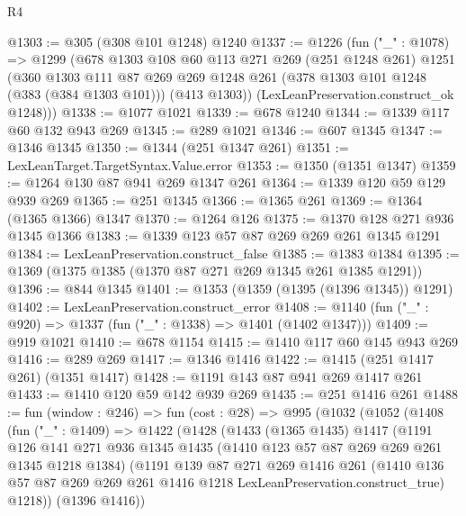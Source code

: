 \begin{lexlean}{R4}
\begin{coremodule}
{{{{{{{{{{{{{{@1303 := @305 (@308 @101 @1248) @1240
@1337 := @1226
    (fun ("_" : @1078) =>
    @1299
      (@678
        @1303
        @108
        @60
        @113
        @271
        @269
        (@251 @1248 @261)
        @1251
        (@360
          @1303
          @111
          @87
          @269
          @269
          @1248
          @261
          (@378 @1303 @101 @1248 (@383 (@384 @1303 @101)))
          (@413 @1303))
        (LexLeanPreservation.construct_ok @1248)))
@1338 := @1077 @1021
@1339 := @678 @1240
@1344 := @1339 @117 @60 @132 @943 @269
@1345 := @289 @1021
@1346 := @607 @1345
@1347 := @1346 @1345
@1350 := @1344 (@251 @1347 @261)
@1351 := LexLeanTarget.TargetSyntax.Value.error
@1353 := @1350 (@1351 @1347)
@1359 := @1264 @130 @87 @941 @269 @1347 @261
@1364 := @1339 @120 @59 @129 @939 @269
@1365 := @251 @1345
@1366 := @1365 @261
@1369 := @1364 (@1365 @1366) @1347
@1370 := @1264 @126
@1375 := @1370 @128 @271 @936 @1345 @1366
@1383 := @1339 @123 @57 @87 @269 @269 @261 @1345 @1291
@1384 := LexLeanPreservation.construct_false
@1385 := @1383 @1384
@1395 := @1369 (@1375 @1385 (@1370 @87 @271 @269 @1345 @261 @1385 @1291))
@1396 := @844 @1345
@1401 := @1353 (@1359 (@1395 (@1396 @1345)) @1291)
@1402 := LexLeanPreservation.construct_error
@1408 := @1140 (fun ("_" : @920) => @1337 (fun ("_" : @1338) => @1401 (@1402 @1347)))
@1409 := @919 @1021
@1410 := @678 @1154
@1415 := @1410 @117 @60 @145 @943 @269
@1416 := @289 @269
@1417 := @1346 @1416
@1422 := @1415 (@251 @1417 @261) (@1351 @1417)
@1428 := @1191 @143 @87 @941 @269 @1417 @261
@1433 := @1410 @120 @59 @142 @939 @269
@1435 := @251 @1416 @261
@1488 := fun (window : @246) =>
  fun (cost : @28) =>
  @995
    (@1032
      (@1052
        (@1408
          (fun ("_" : @1409) =>
          @1422
            (@1428
              (@1433
                (@1365 @1435)
                @1417
                (@1191
                  @126
                  @141
                  @271
                  @936
                  @1345
                  @1435
                  (@1410 @123 @57 @87 @269 @269 @261 @1345 @1218 @1384)
                  (@1191
                    @139
                    @87
                    @271
                    @269
                    @1416
                    @261
                    (@1410
                      @136
                      @57
                      @87
                      @269
                      @269
                      @261
                      @1416
                      @1218
                      LexLeanPreservation.construct_true)
                    @1218))
                (@1396 @1416))
}}}}}}}}}}}}}}
\end{coremodule}
\end{lexlean}
